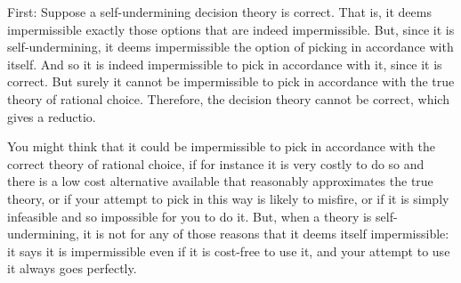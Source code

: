 \documentclass[a4paper,final]{article}
\newcommand{\todoinfo}[2][]{\todo[inline,{#1}]{#2}}
\renewcommand{\color}[1]{}
\newenvironment{colored}[1]{\leavevmode\color{#1}}{}
\newenvironment{CCM rewritten}
{\begingroup\color{blue}} %
{\endgroup}              %
\begin{document}
%	
%
%


	
First: Suppose a self-undermining decision theory is correct. That is, it deems impermissible exactly those options that are indeed impermissible. But, since it is self-undermining, it deems impermissible the option of picking in accordance with itself. And so it is indeed impermissible to pick in accordance with it, since it is correct. But surely it cannot be impermissible to pick in accordance with the true theory of rational choice. Therefore, the decision theory cannot be correct, which gives a reductio.

You might think that it could be impermissible to pick in accordance with the correct theory of rational choice, if for instance it is very costly to do so and there is a low cost alternative available that reasonably approximates the true theory, or if your attempt to pick in this way is likely to misfire, or if it is simply infeasible and so impossible for you to do it. But, when a theory is self-undermining, it is not for any of those reasons that it deems itself impermissible: it says it is impermissible even if it is cost-free to use it, and your attempt to use it always goes perfectly.
\end{document}
